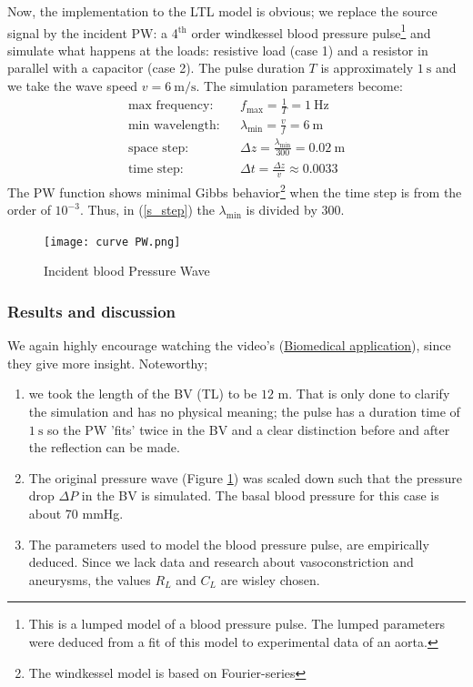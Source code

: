 Now, the implementation to the LTL model is obvious; we replace the source signal by  the incident PW: a 4$^{\text{th}}$ order windkessel blood pressure pulse\footnote{This is a lumped model of a blood pressure pulse. The lumped parameters were deduced from a fit of this model to experimental data of an aorta.} and simulate what happens at the loads: resistive load (case 1) and a resistor in parallel with a capacitor (case 2). The pulse duration $T$ is approximately $1 \ \mathrm{s}$ and we take the wave speed $v = 6 \ \mathrm{m/s}$. The simulation parameters become:
\begin{align}
\text{max frequency}: &&f_{\text{max}} = \frac{1}{T} = 1 \ \mathrm{Hz} \\
\text{min wavelength}: &&\lambda_{\text{min}} = \frac{v}{f} = 6 \ \mathrm{m} \\
\text{space step}: &&\Delta z = \frac{\lambda_{\text{min}}}{300} = 0.02   \ \mathrm{m}\label{s_step} \\
\text{time step}: &&\Delta t = \frac{\Delta z}{v} \approx 0.0033 
\end{align}
The PW function shows minimal Gibbs behavior\footnote{The windkessel model is based on Fourier-series} when the time step is from the order of $10^{-3}$. Thus, in (\ref{s_step}) the $\lambda_{\text{min}}$ is divided by $300$.

\begin{figure}[h!]
\centering
\texttt{[image: curve PW.png]}
\caption{Incident blood Pressure Wave}\label{fig:BPW}
\end{figure}


\subsubsection{Results and discussion}
We again highly encourage watching the video's (\href{https://ugentbe-my.sharepoint.com/:f:/g/personal/constantijn_coppers_ugent_be/Evlx5Q0EKRhCggn-R1x3NKQBhiF82wRowFP4pT1nCn1ymg?e=Xi2V3R}{Biomedical application}), since they give more insight. Noteworthy;
\begin{enumerate}
\item we took the length of the BV (TL) to be $12$ m. That is only done to clarify the simulation and has no physical meaning; the pulse has a duration time of $1 \ \mathrm{s}$ so the PW 'fits' twice in the BV and a clear distinction before and after the reflection can be made.

\item The original pressure wave (Figure \ref{fig:BPW}) was scaled down such that the pressure drop $\Delta P$ in the BV is simulated. The basal blood pressure for this case is about 70 mmHg.

\item The parameters used to model the blood pressure pulse, are empirically deduced. Since we lack data and research about vasoconstriction and aneurysms, the values $R_L$ and $C_L$ are wisley chosen. 
\end{enumerate}

